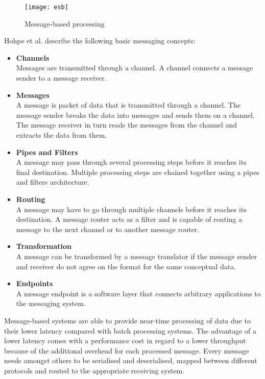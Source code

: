 \begin{figure}[h!]
	\centering
	\texttt{[image: esb]}
	\caption{Message-based processing}
	\label{fig:message_based_processing}
\end{figure}

Hohpe et al.\cite{Hohpe:2003fk} describe the following basic messaging concepts:
\begin{itemize}
	\item \textbf{Channels}\\
	Messages are transmitted through a channel. A channel connects a message sender to a message receiver.
	\item \textbf{Messages}\\
	A message is packet of data that is transmitted through a channel. The message sender breaks the data into messages and sends them on a channel. The message receiver in turn reads the messages from the channel and extracts the data from them.
	\item \textbf{Pipes and Filters}\\
	A message may pass through several processing steps before it reaches its final destination. Multiple processing steps are chained together using a pipes and filters architecture.
	\item \textbf{Routing}\\
	A message may have to go through multiple channels before it reaches its destination. A message router acts as a filter and is capable of routing a message to the next channel or to another message router.
	\item \textbf{Transformation}\\
	A message can be transformed by a message translator if the message sender and receiver do not agree on the format for the same conceptual data.
	\item \textbf{Endpoints}\\
	A message endpoint is a software layer that connects arbitrary applications to the messaging system.
\end{itemize}

Message-based systems are able to provide near-time processing of data due to their lower latency compared with batch processing systems. The advantage of a lower latency comes with a performance cost in regard to a lower throughput because of the additional overhead for each processed message. Every message needs amongst others to be serialised and deserialised, mapped between different protocols and routed to the appropriate receiving system.

